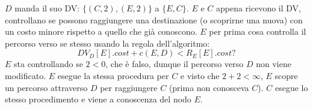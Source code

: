 \documentclass[10pt]{article}
\begin{document}
			\newline \newline
			$D$ manda il suo DV: $\{(C,2),(E,2)\}$ a $\{E,C\}$.
			\newline
			$E$ e $C$ appena ricevono il DV, controllano se possono raggiungere una destinazione (o scoprirne una nuova) con un costo minore rispetto a quello che già conoscono.
			\newline
			$E$ per prima cosa controlla il percorso verso se stesso usando la regola dell'algoritmo: $$DV_D[E].cost + c(E,D) < R_E[E].cost?$$
			$E$ sta controllando se $2<0$, che è falso, dunque il percorso verso $D$ non viene modificato.
			\newline
			$E$ esegue la stessa procedura per $C$ e visto che $2+2 < \infty$, $E$ scopre un percorso attraverso $D$ per raggiungere $C$ (prima non conosceva $C$).
			\newline
			$C$ esegue lo stesso procedimento e viene a conoscenza del nodo $E$.
\end{document}
